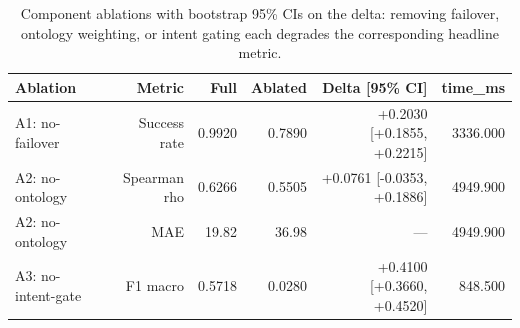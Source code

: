 \begin{table}[t]
\centering
\caption{Component ablations with bootstrap 95\% CIs on the delta: removing failover, ontology weighting, or intent gating each degrades the corresponding headline metric.}
\label{tab:ablations}
\begin{tabular}{lrrrrr}
\hline
Ablation & Metric & Full & Ablated & Delta [95\% CI] & time\_ms \\
\hline
A1: no-failover & Success rate & 0.9920 & 0.7890 & +0.2030 [+0.1855, +0.2215] & 3336.000 \\
A2: no-ontology & Spearman rho & 0.6266 & 0.5505 & +0.0761 [-0.0353, +0.1886] & 4949.900 \\
A2: no-ontology & MAE & 19.82 & 36.98 & — & 4949.900 \\
A3: no-intent-gate & F1 macro & 0.5718 & 0.0280 & +0.4100 [+0.3660, +0.4520] & 848.500 \\
\hline
\end{tabular}
\end{table}
